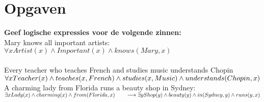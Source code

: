 \documentclass[12pt]{article}
\begin{document}
\maketitle

\section{Opgaven}

\textbf{Geef logische expressies voor de volgende zinnen:}\\
Mary knows all important artists:\\
$\forall xArtist(x) \wedge Important(x) \wedge knows(Mary, x)$\\
\\
Every teacher who teaches French and studies music understands Chopin\\
$\forall xTeacher(x) \wedge teaches(x, French) \wedge\\ studies(x, Music) \wedge understands(Chopin, x)$
\\
A charming lady from Florida runs a beauty shop in Sydney:\\
$\exists xLady(x) \wedge charming(x) \wedge  from(Florida,x)\\
\hspace*{2em} \longrightarrow\\
\exists yShop(y) \wedge beauty(y) \wedge in(Sydney, y) \wedge runs(y,x)$
\end{document}
